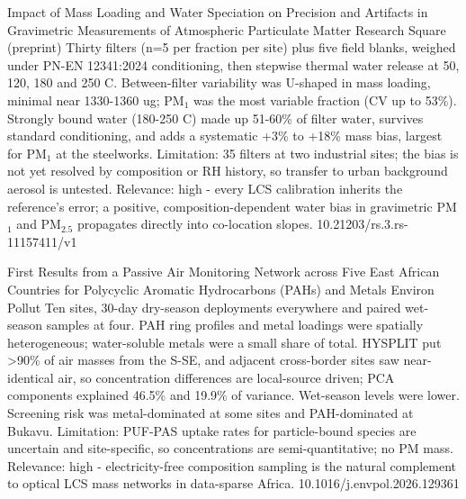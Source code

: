 \documentclass[10pt]{article}
\begin{document}
{Impact of Mass Loading and Water Speciation on Precision and Artifacts in Gravimetric Measurements of Atmospheric Particulate Matter}
{Research Square (preprint)}
{Thirty filters (n=5 per fraction per site) plus five field blanks, weighed under PN-EN 12341:2024 conditioning, then stepwise thermal water release at 50, 120, 180 and 250 C. Between-filter variability was U-shaped in mass loading, minimal near 1330-1360 ug; PM$_{1}$ was the most variable fraction (CV up to 53\%). Strongly bound water (180-250 C) made up 51-60\% of filter water, survives standard conditioning, and adds a systematic +3\% to +18\% mass bias, largest for PM$_{1}$ at the steelworks. Limitation: 35 filters at two industrial sites; the bias is not yet resolved by composition or RH history, so transfer to urban background aerosol is untested. Relevance: high - every LCS calibration inherits the reference's error; a positive, composition-dependent water bias in gravimetric PM$_{1}$ and PM$_{2.5}$ propagates directly into co-location slopes.}
{10.21203/rs.3.rs-11157411/v1}

{First Results from a Passive Air Monitoring Network across Five East African Countries for Polycyclic Aromatic Hydrocarbons (PAHs) and Metals}
{Environ Pollut}
{Ten sites, 30-day dry-season deployments everywhere and paired wet-season samples at four. PAH ring profiles and metal loadings were spatially heterogeneous; water-soluble metals were a small share of total. HYSPLIT put >90\% of air masses from the S-SE, and adjacent cross-border sites saw near-identical air, so concentration differences are local-source driven; PCA components explained 46.5\% and 19.9\% of variance. Wet-season levels were lower. Screening risk was metal-dominated at some sites and PAH-dominated at Bukavu. Limitation: PUF-PAS uptake rates for particle-bound species are uncertain and site-specific, so concentrations are semi-quantitative; no PM mass. Relevance: high - electricity-free composition sampling is the natural complement to optical LCS mass networks in data-sparse Africa.}
{10.1016/j.envpol.2026.129361}
\end{document}
